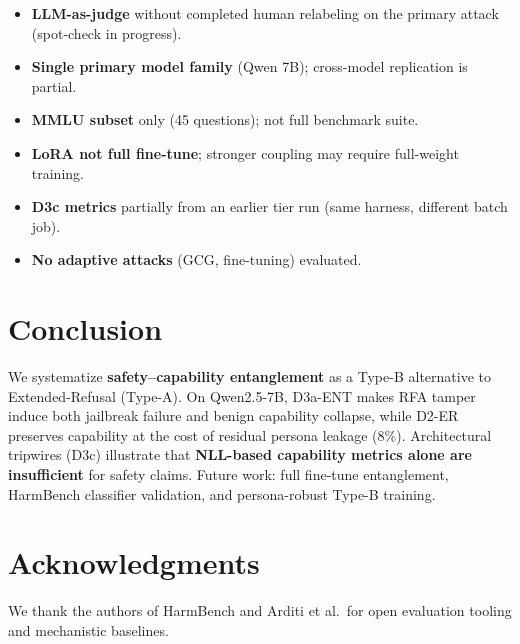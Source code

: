 \documentclass[11pt]{article}
\begin{document}
\begin{itemize}[leftmargin=*]
  \item \textbf{LLM-as-judge} without completed human relabeling on the primary attack (spot-check in progress).
  \item \textbf{Single primary model family} (Qwen 7B); cross-model replication is partial.
  \item \textbf{MMLU subset} only (45 questions); not full benchmark suite.
  \item \textbf{LoRA not full fine-tune}; stronger coupling may require full-weight training.
  \item \textbf{D3c metrics} partially from an earlier tier run (same harness, different batch job).
  \item \textbf{No adaptive attacks} (GCG, fine-tuning) evaluated.
\end{itemize}

\section{Conclusion}

We systematize \textbf{safety--capability entanglement} as a Type-B alternative to Extended-Refusal (Type-A).
On Qwen2.5-7B, D3a-ENT makes RFA tamper induce both jailbreak failure and benign capability collapse, while D2-ER preserves capability at the cost of residual persona leakage (8\%).
Architectural tripwires (D3c) illustrate that \textbf{NLL-based capability metrics alone are insufficient} for safety claims.
Future work: full fine-tune entanglement, HarmBench classifier validation, and persona-robust Type-B training.

\section*{Acknowledgments}
We thank the authors of HarmBench and Arditi et al.\ for open evaluation tooling and mechanistic baselines.




\appendix

\end{document}
